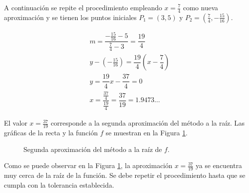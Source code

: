 \begin{exerciseT}
	A continuación se repite el procedimiento empleando $x=\frac{7}{4}$ como nueva aproximación y se tienen 
	los puntos iniciales $P_1=\left(3,5\right)$ y $P_2=\left(\frac{7}{4}, -\frac{15}{16}\right)$.

	\begin{align*}
		& m = \dfrac{-\frac{15}{16} - 5}{\frac{7}{4} - 3} = \dfrac{19}{4} \\
		& y-\left(-\frac{15}{16}\right) = \dfrac{19}{4}\left(x-\dfrac{7}{4}\right) \\
		& y = \dfrac{19}{4}x - \dfrac{37}{4} = 0 \\
		& x = \dfrac{\frac{37}{4}}{\frac{19}{4}} = \dfrac{37}{19} = 1.9473\dots
	\end{align*}

	El valor $x = \frac{37}{19}$ corresponde a la segunda aproximación del método a la raíz. Las gráficas de la  
	recta y la función $f$ se muestran en la Figura \ref{fig:Secante03}.

	\begin{figure}[H]
		\centering
		\caption{Segunda aproximación del método a la raíz de $f$.}
		\label{fig:Secante03}
	\end{figure}

	Como se puede observar en la Figura \ref{fig:Secante03}, la aproximación $x = \frac{37}{19}$ ya se encuentra
	muy cerca de la raíz de la función. Se debe repetir el procedimiento hasta que se cumpla con la tolerancia establecida.
	\label{ex:Secante04}

\end{exerciseT}


